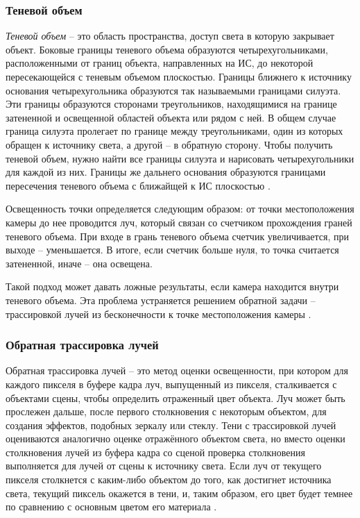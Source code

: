 \subsubsection*{Теневой объем}

\textit{Теневой объем} -- это область пространства, доступ света в которую закрывает объект. Боковые границы теневого объема образуются четырехугольниками, расположенными от границ объекта, направленных на ИС, до некоторой пересекающейся с теневым объемом плоскостью. Границы ближнего к источнику основания четырехугольника образуются так называемыми границами силуэта. Эти границы образуются сторонами треугольников, находящимися на границе затененной и освещенной областей объекта или рядом с ней. В общем случае граница силуэта пролегает по границе между треугольниками, один из которых обращен к источнику света, а другой -- в обратную сторону. Чтобы получить теневой объем, нужно найти все границы силуэта и нарисовать четырехугольники для каждой из них. Границы же дальнего основания образуются границами пересечения теневого объема с ближайщей к ИС плоскостью \cite{shad_vol}.

Освещенность точки определяется следующим образом: от точки местоположения камеры до нее проводится луч, который связан со счетчиком прохождения граней теневого объема. При входе в грань теневого объема счетчик увеличивается, при выходе -- уменьшается. В итоге, если счетчик больше нуля, то точка считается затененной, иначе -- она освещена.

Такой подход может давать ложные результаты, если камера находится внутри теневого объема. Эта проблема устраняется решением обратной задачи -- трассировкой лучей из бесконечности к точке местоположения камеры \cite{shad_vol}.

\subsubsection*{Обратная трассировка лучей}

Обратная трассировка лучей -- это метод оценки освещенности, при котором для каждого пикселя в буфере кадра луч, выпущенный из пикселя, сталкивается с объектами сцены, чтобы определить отраженный цвет объекта. Луч может быть прослежен дальше, после первого столкновения с некоторым объектом, для создания эффектов, подобных зеркалу или стеклу. Тени с трассировкой лучей оцениваются аналогично оценке отражённого объектом света, но вместо оценки столкновения лучей из буфера кадра со сценой проверка столкновения выполняется для лучей от сцены к источнику света. Если луч от текущего пикселя столкнется с каким-либо объектом до того, как достигнет источника света, текущий пиксель окажется в тени, и, таким образом, его цвет будет темнее по сравнению с основным цветом его материала \cite{engel2008programming}.

